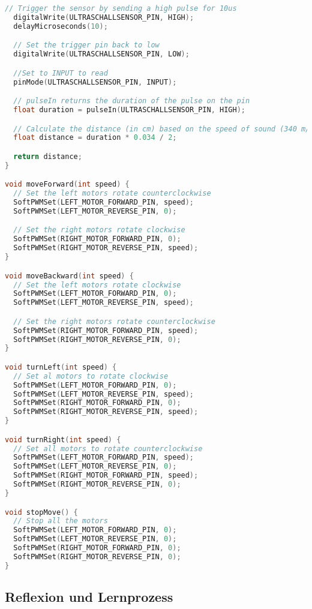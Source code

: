 \documentclass{vorlage-design-main}
\begin{document}
\begin{lstlisting}[language={C++}]
  // Trigger the sensor by sending a high pulse for 10us
  digitalWrite(ULTRASCHALLSENSOR_PIN, HIGH);
  delayMicroseconds(10);

  // Set the trigger pin back to low
  digitalWrite(ULTRASCHALLSENSOR_PIN, LOW);

  //Set to INPUT to read
  pinMode(ULTRASCHALLSENSOR_PIN, INPUT);

  // pulseIn returns the duration of the pulse on the pin
  float duration = pulseIn(ULTRASCHALLSENSOR_PIN, HIGH);

  // Calculate the distance (in cm) based on the speed of sound (340 m/s or 0.034 cm/us)
  float distance = duration * 0.034 / 2;

  return distance;
}

void moveForward(int speed) {
  // Set the left motors rotate counterclockwise
  SoftPWMSet(LEFT_MOTOR_FORWARD_PIN, speed);
  SoftPWMSet(LEFT_MOTOR_REVERSE_PIN, 0);

  // Set the right motors rotate clockwise
  SoftPWMSet(RIGHT_MOTOR_FORWARD_PIN, 0);
  SoftPWMSet(RIGHT_MOTOR_REVERSE_PIN, speed);
}

void moveBackward(int speed) {
  // Set the left motors rotate clockwise
  SoftPWMSet(LEFT_MOTOR_FORWARD_PIN, 0);
  SoftPWMSet(LEFT_MOTOR_REVERSE_PIN, speed);

  // Set the right motors rotate counterclockwise
  SoftPWMSet(RIGHT_MOTOR_FORWARD_PIN, speed);
  SoftPWMSet(RIGHT_MOTOR_REVERSE_PIN, 0);
}

void turnLeft(int speed) {
  // Set al motors to rotate clockwise
  SoftPWMSet(LEFT_MOTOR_FORWARD_PIN, 0);
  SoftPWMSet(LEFT_MOTOR_REVERSE_PIN, speed);
  SoftPWMSet(RIGHT_MOTOR_FORWARD_PIN, 0);
  SoftPWMSet(RIGHT_MOTOR_REVERSE_PIN, speed);
}

void turnRight(int speed) {
  // Set all motors to rotate counterclockwise
  SoftPWMSet(LEFT_MOTOR_FORWARD_PIN, speed);
  SoftPWMSet(LEFT_MOTOR_REVERSE_PIN, 0);
  SoftPWMSet(RIGHT_MOTOR_FORWARD_PIN, speed);
  SoftPWMSet(RIGHT_MOTOR_REVERSE_PIN, 0);
}

void stopMove() {
  // Stop all the motors
  SoftPWMSet(LEFT_MOTOR_FORWARD_PIN, 0);
  SoftPWMSet(LEFT_MOTOR_REVERSE_PIN, 0);
  SoftPWMSet(RIGHT_MOTOR_FORWARD_PIN, 0);
  SoftPWMSet(RIGHT_MOTOR_REVERSE_PIN, 0);
}
\end{lstlisting}

\hypertarget{reflexion-und-lernprozess}{%
\subsection{Reflexion und Lernprozess}\label{reflexion-und-lernprozess}}
\end{document}
